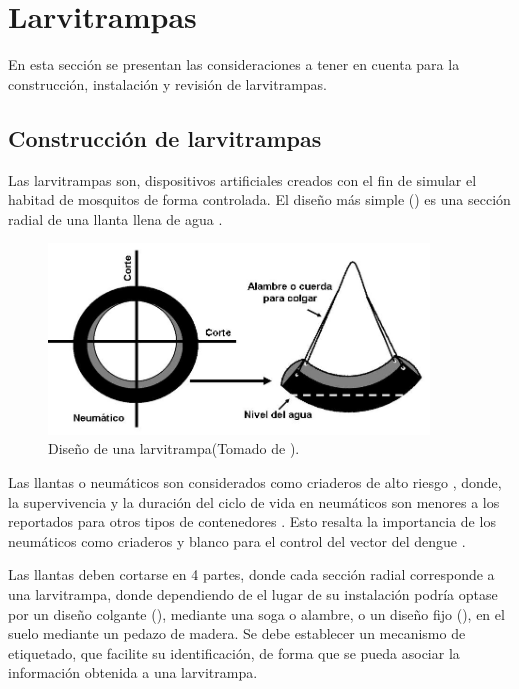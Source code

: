 \chapter{Larvitrampas}
En esta sección se presentan las consideraciones a tener en cuenta para la construcción, instalación y revisión de larvitrampas.

\section{Construcción de larvitrampas}
Las larvitrampas son, dispositivos artificiales creados con el fin de simular el habitad de mosquitos de forma controlada. El diseño más simple ()
es una sección radial de una llanta llena de agua \cite{world2009dengue, manualControlArg2009}.

\begin{figure}[!htbp]
\centering
\includegraphics[width=0.9\textwidth]{anexos/graphics/construccion-larvitrampa.png}
\caption{\label{fig:anexo-construccion-larvitrampas} Diseño de una larvitrampa(Tomado de
\cite{manualControlArg2009}).}
\end{figure}

Las llantas o neumáticos son considerados como criaderos de alto riesgo
\cite{bisset2008distribucion, manrique1998desarrollo, ulloa1996abundancia}, donde, la
supervivencia y la  duración del ciclo de vida en neumáticos son menores a los reportados para
otros tipos de contenedores \cite{manrique1998desarrollo}. Esto resalta la importancia de los
neumáticos como criaderos y blanco para el control del vector del dengue
\cite{manrique1998desarrollo, ulloa1996abundancia}.

Las llantas deben cortarse en 4 partes, donde cada sección radial corresponde a una larvitrampa,
donde dependiendo de el lugar de su instalación podría optase por un diseño colgante
(), mediante una soga o alambre, o un diseño fijo
(), en el suelo mediante un pedazo de madera. Se debe establecer un
mecanismo de etiquetado, que facilite su identificación, de forma que se pueda asociar la
información obtenida a una larvitrampa.

